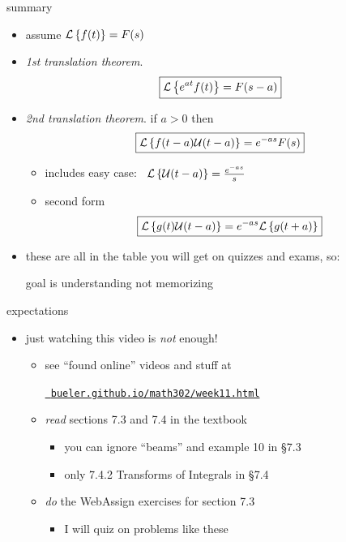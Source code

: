 \documentclass[urlcolor=blue,dvipsnames]{beamer}
\begin{document}
\begin{frame}{summary}

\begin{itemize}
\item assume $\mathcal{L}\left\{f(t)\right\}=F(s)$
\item \emph{1st translation theorem}.
    $$\boxed{\mathcal{L}\left\{e^{at} f(t)\right\} = F(s-a)}$$
\item \emph{2nd translation theorem}.  if $a>0$ then
    $$\boxed{\mathcal{L}\left\{f(t-a) \mathcal{U}(t-a)\right\} = e^{-as} F(s)}$$

\vspace{-2mm}
    \begin{itemize}
    \item includes easy case: \, $\mathcal{L}\left\{\mathcal{U}(t-a)\right\} = \frac{e^{-as}}{s}$
    \item second form
        $$\boxed{\mathcal{L}\left\{g(t) \mathcal{U}(t-a)\right\} = e^{-as} \mathcal{L}\left\{g(t+a)\right\}}$$
    \end{itemize}

\medskip
\item these are all in the table you will get on quizzes and exams, so:

\centerline{\alert{goal is understanding not memorizing}}
\end{itemize}
\end{frame}


\begin{frame}{expectations}

\begin{itemize}
\item just watching this video is \emph{not} enough!
     \begin{itemize}
     \item see ``found online'' videos and stuff at

     \centerline{\href{https://bueler.github.io/math302/week11.html}{\tt \color{cyan} bueler.github.io/math302/week11.html}}
     \item \emph{read} sections 7.3 and 7.4 in the textbook
         \begin{itemize}
         \item you can ignore ``beams'' and example 10 in \S7.3
         \item only 7.4.2 Transforms of Integrals in \S7.4
         \end{itemize}
     \item \emph{do} the WebAssign exercises for section 7.3
         \begin{itemize}
         \item I will quiz on problems like these
         \end{itemize}
     \end{itemize}
\end{itemize}
\end{frame}
\end{document}

